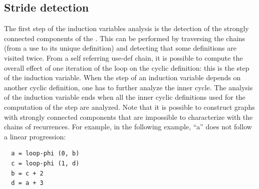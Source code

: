 \subsection{Stride detection}

The first step of the induction variables analysis is the detection of
the strongly connected components of the \SSA{}.  This can be
performed by traversing the \SSA{} chains (from a use to its unique
definition) and detecting that some definitions are visited twice.
From a self referring use-def chain, it is possible to compute the
overall effect of one iteration of the loop on the cyclic definition:
this is the step of the induction variable.  When the step of an
induction variable depends on another cyclic definition, one has to
further analyze the inner cycle.  The analysis of the induction
variable ends when all the inner cyclic definitions used for the
computation of the step are analyzed.  Note that it is possible to
construct \SSA{} graphs with strongly connected components that are
impossible to characterize with the chains of recurrences.  For
example, in the following example, ``a'' does not follow a linear
progression:
\begin{verbatim}
  a = loop-phi (0, b)
  c = loop-phi (1, d)
  b = c + 2
  d = a + 3
\end{verbatim}

